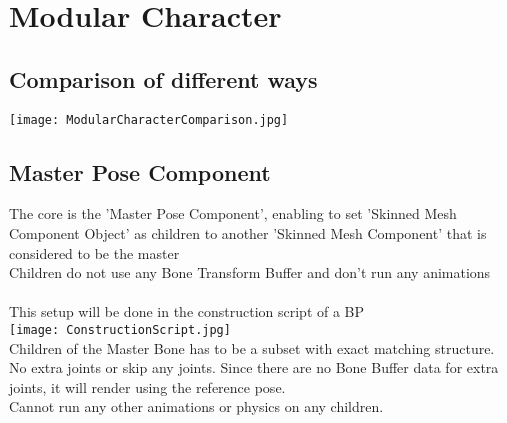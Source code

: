 \documentclass{scrbook}
\begin{document}








    \chapter{Modular Character}

            \section{Comparison of different ways}
                 \texttt{[image: ModularCharacterComparison.jpg]}

            \section{Master Pose Component}
                The core is the 'Master Pose Component', enabling to set 'Skinned Mesh Component Object' as children
                to another 'Skinned Mesh Component' that is considered to be the master \\
                Children do not use any Bone Transform Buffer and don't run any animations \\
\smallskip \\
                This setup will be done in the construction script of a BP \\
                \texttt{[image: ConstructionScript.jpg]} \\
                Children of the Master Bone has to be a subset with exact matching structure. \\
                No extra joints or skip any joints. Since there are no Bone Buffer data for extra joints,
                it will render using the reference pose. \\
                Cannot run any other animations or physics on any children. \\
\end{document}
